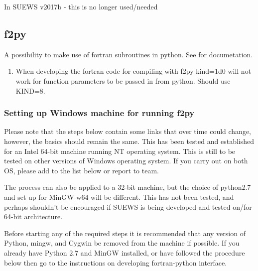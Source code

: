 \documentclass[letterpaper,10pt,english]{sphinxmanual}
\begin{document}
In SUEWS v2017b - this is no longer used/needed


\subsection{f2py}
\label{\detokenize{DevelopmentGuidelines:f2py}}
A possibility to make use of fortran subroutines in python. See
 for documetation.
\begin{enumerate}
\item {} 
When developing the fortran code for compiling with f2py kind=1d0
will not work for function parameters to be passed in from python.
Should use KIND=8.

\end{enumerate}


\subsubsection{Setting up Windows machine for running f2py}
\label{\detokenize{DevelopmentGuidelines:setting-up-windows-machine-for-running-f2py}}
Please note that the steps below contain some links that over time could
change, however, the basics should remain the same. This has been tested
and established for an Intel 64-bit machine running NT operating system.
This is still to be tested on other versions of Windows operating
system. If you carry out on both OS, please add to the list below or
report to team.

The process can also be applied to a 32-bit machine, but the choice of
python2.7 and set up for MinGW-w64 will be different. This has not been
tested, and perhaps shouldn’t be encouraged if SUEWS is being developed
and tested on/for 64-bit architecture.

Before starting any of the required steps it is recommended that any
version of Python, mingw, and Cygwin be removed from the machine if
possible. If you already have Python 2.7 and MinGW installed, or have
followed the procedure below then go to the instructions on developing
fortran-python interface.
\end{document}
